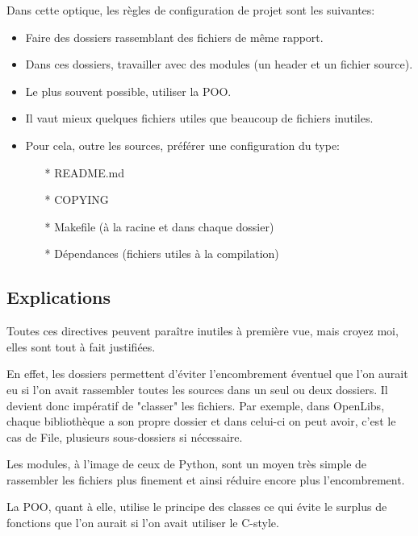 \documentclass[a4paper,12pt]{report}
\begin{document}
Dans cette optique, les règles de configuration de projet sont les 
suivantes:\newline

\begin{itemize}
    \item Faire des dossiers rassemblant des fichiers de même rapport.
    \item Dans ces dossiers, travailler avec des modules (un header et 
          un fichier source).
    \item Le plus souvent possible, utiliser la POO.
    \item Il vaut mieux quelques fichiers utiles que beaucoup de 
          fichiers inutiles.
    \item Pour cela, outre les sources, préférer une configuration du 
          type: 
          \begin{itemize}
                \item[*] README.md
                \item[*] COPYING
                \item[*] Makefile (à la racine et dans chaque dossier)
                \item[*] Dépendances (fichiers utiles à la compilation)
          \end{itemize}
\end{itemize}

\subsection{Explications}
Toutes ces directives peuvent paraître inutiles à première vue, mais 
croyez moi, elles sont tout à fait justifiées.\newline

En effet, les dossiers permettent d'éviter l'encombrement éventuel 
que l'on aurait eu si l'on avait rassembler toutes les sources dans 
un seul ou deux dossiers. Il devient donc impératif de "classer" les 
fichiers. Par exemple, dans OpenLibs, chaque bibliothèque a son propre 
dossier et dans celui-ci on peut avoir, c'est le cas de File, plusieurs 
sous-dossiers si nécessaire.\newline

Les modules, à l'image de ceux de Python, sont un moyen très simple de 
rassembler les fichiers plus finement et ainsi réduire encore plus 
l'encombrement.\newline

La POO, quant à elle, utilise le principe des classes ce qui évite le 
surplus de fonctions que l'on aurait si l'on avait utiliser le 
C-style. \newline
\end{document}
